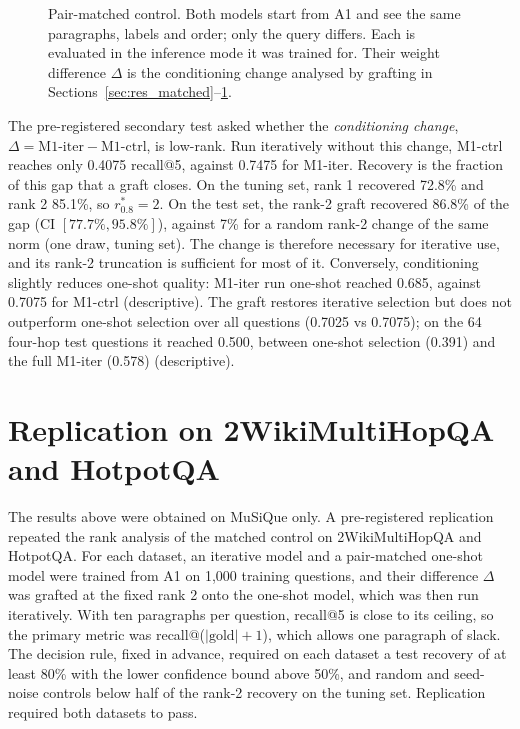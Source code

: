 \begin{figure}[htbp]
\centering

\caption{Pair-matched control. Both models start from A1 and see the same paragraphs, labels and order; only the query differs. Each is evaluated in the inference mode it was trained for. Their weight difference $\Delta$ is the conditioning change analysed by grafting in Sections~\ref{sec:res_matched}--\ref{sec:res_replication}.}
\label{fig:matched}
\end{figure}

The pre-registered secondary test asked whether the \emph{conditioning change}, $\Delta = \text{M1-iter} - \text{M1-ctrl}$, is low-rank. Run iteratively without this change, M1-ctrl reaches only 0.4075 recall@5, against 0.7475 for M1-iter. Recovery is the fraction of this gap that a graft closes. On the tuning set, rank 1 recovered 72.8\% and rank 2 85.1\%, so $r^*_{0.8}=2$. On the test set, the rank-2 graft recovered 86.8\% of the gap (CI $[77.7\%, 95.8\%]$), against 7\% for a random rank-2 change of the same norm (one draw, tuning set). The change is therefore necessary for iterative use, and its rank-2 truncation is sufficient for most of it. Conversely, conditioning slightly reduces one-shot quality: M1-iter run one-shot reached 0.685, against 0.7075 for M1-ctrl (descriptive). The graft restores iterative selection but does not outperform one-shot selection over all questions (0.7025 vs 0.7075); on the 64 four-hop test questions it reached 0.500, between one-shot selection (0.391) and the full M1-iter (0.578) (descriptive).

\section{Replication on 2WikiMultiHopQA and HotpotQA}
\label{sec:res_replication}

The results above were obtained on MuSiQue only. A pre-registered replication repeated the rank analysis of the matched control on 2WikiMultiHopQA and HotpotQA. For each dataset, an iterative model and a pair-matched one-shot model were trained from A1 on 1,000 training questions, and their difference $\Delta$ was grafted at the fixed rank 2 onto the one-shot model, which was then run iteratively. With ten paragraphs per question, recall@5 is close to its ceiling, so the primary metric was recall@($|\text{gold}|+1$), which allows one paragraph of slack. The decision rule, fixed in advance, required on each dataset a test recovery of at least 80\% with the lower confidence bound above 50\%, and random and seed-noise controls below half of the rank-2 recovery on the tuning set. Replication required both datasets to pass.

